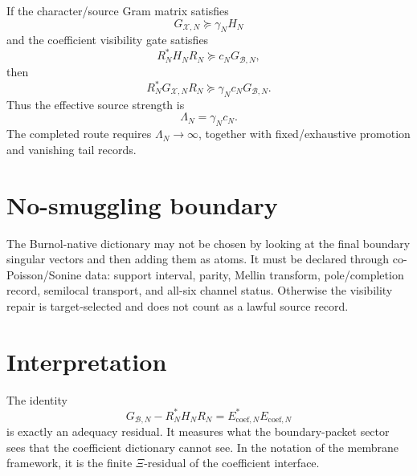 \documentclass[11pt]{article}
\begin{document}
If the character/source Gram matrix satisfies
\[
G_{\mathcal X,N}\succeq \gamma_N H_N
\]
and the coefficient visibility gate satisfies
\[
R_N^*H_NR_N\succeq c_NG_{\mathcal B,N},
\]
then
\[
R_N^*G_{\mathcal X,N}R_N
\succeq
\gamma_Nc_NG_{\mathcal B,N}.
\]
Thus the effective source strength is
\[
\Lambda_N=\gamma_Nc_N.
\]
The completed route requires \(\Lambda_N\to\infty\), together with fixed/exhaustive
promotion and vanishing tail records.

\section{No-smuggling boundary}

The Burnol-native dictionary may not be chosen by looking at the final boundary
singular vectors and then adding them as atoms.  It must be declared through
co-Poisson/Sonine data: support interval, parity, Mellin transform, pole/completion
record, semilocal transport, and all-six channel status.  Otherwise the visibility
repair is target-selected and does not count as a lawful source record.

\section{Interpretation}

The identity
\[
G_{\mathcal B,N}-R_N^*H_NR_N=E_{\mathrm{coef},N}^*E_{\mathrm{coef},N}
\]
is exactly an adequacy residual.  It measures what the boundary-packet sector sees
that the coefficient dictionary cannot see.  In the notation of the membrane
framework, it is the finite \( \Xi \)-residual of the coefficient interface.
\end{document}
